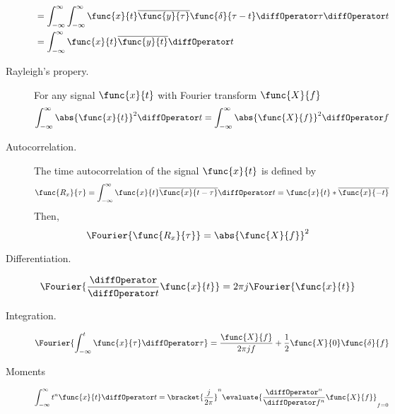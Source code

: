 \begin{description}
\begin{align*}
        &= \int_{-\infty}^{\infty}  \int_{-\infty}^{\infty}  \func{x}{t} \overline{\func{y}{\tau}} \func{\delta}{\tau  - t}  \diffOperator \tau \diffOperator t\\
        &= \int_{-\infty}^{\infty} \func{x}{t} \overline{\func{y}{t}} \diffOperator t\\
    \end{align*}
    \item[Rayleigh's propery.]  For any signal \(\func{x}{t}\) with Fourier transform \(\func{X}{f}\)
    \begin{equation*}
        \int_{-\infty}^{\infty} \abs{\func{x}{t}}^2 \diffOperator t = \int_{-\infty}^{\infty} \abs{\func{X}{f}}^2 \diffOperator f
    \end{equation*}
    \item[Autocorrelation.] The time autocorrelation of the signal \(\func{x}{t}\) is defined by 
    \begin{equation*}
        \func{R_{x}}{\tau} = \int_{-\infty}^{\infty} \func{x}{t} \overline{\func{x}{t - \tau}} \diffOperator t = \func{x}{t} \ast \overline{\func{x}{-t}}
    \end{equation*} 
    Then, 
    \begin{equation*}
        \Fourier{\func{R_x}{\tau}} = \abs{\func{X}{f}}^2
    \end{equation*}
    \item[Differentiation.]
    \begin{equation*}
        \Fourier{\dfrac{\diffOperator}{\diffOperator t} \func{x}{t}} = 2\pi j \Fourier{\func{x}{t}}
    \end{equation*}
    \item[Integration.]
    \begin{equation*}
        \Fourier{\int_{-\infty}^t \func{x}{\tau} \diffOperator \tau}=\dfrac{\func{X}{f}}{2\pi j f} + \dfrac{1}{2} \func{X}{0} \func{\delta}{f}
    \end{equation*}
    \item[Moments]
    \begin{equation*}
       \int_{-\infty}^{\infty} t^n \func{x}{t} \diffOperator t =\bracket{\dfrac{j}{2\pi}}^n \evaluate{\dfrac{\diffOperator^n}{\diffOperator f^n} \func{X}{f}}_{f = 0}
    \end{equation*}
\end{description}

